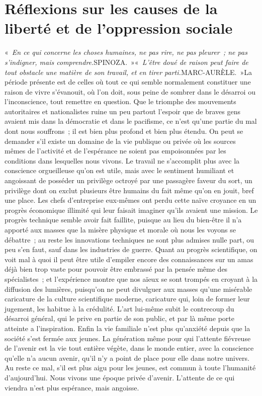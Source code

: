 \documentclass[french,twoside]{book} %
\begin{document}
\section[{Réflexions sur les causes de la liberté et de l’oppression sociale}]{Réflexions sur les causes de la liberté et de l’oppression sociale}\renewcommand{\leftmark}{Réflexions sur les causes de la liberté et de l’oppression sociale}

« \emph{En ce qui concerne les choses humaines, ne pas rire, ne pas pleurer ; ne pas s'indigner, mais comprendre.}{\citbibl SPINOZA.} »« \emph{L'être doué de raison peut faire de tout obstacle une matière de son travail, et en tirer parti.}{\citbibl MARC-AURÈLE.} »\noindent La période présente est de celles où tout ce qui semble normalement constituer une raison de vivre s'évanouit, où l'on doit, sous peine de sombrer dans le désarroi ou l'inconscience, tout remettre en question. Que le triomphe des mouvements autoritaires et nationalistes ruine un peu partout l'espoir que de braves gens avaient mis dans la démocratie et dans le pacifisme, ce n'est qu'une partie du mal dont nous souffrons ; il est bien plus profond et bien plus étendu. On peut se demander s'il existe un domaine de la vie publique ou privée où les sources mêmes de l'activité et de l'espérance ne soient pas empoisonnées par les conditions dans lesquelles nous vivons. Le travail ne s'accomplit plus avec la conscience orgueilleuse qu'on est utile, mais avec le sentiment humiliant et angoissant de posséder un privilège octroyé par une passagère faveur du sort, un privilège dont on exclut plusieurs être humains du fait même qu'on en jouit, bref une place. Les chefs d'entreprise eux-mêmes ont perdu cette naïve croyance en un progrès économique illimité qui leur faisait imaginer qu'ils avaient une mission. Le progrès technique semble avoir fait faillite, puisque au lieu du bien-être il n'a apporté aux masses que la misère physique et morale où nous les voyons se débattre ; au reste les innovations techniques ne sont plus admises nulle part, ou peu s'en faut, sauf dans les industries de guerre. Quant au progrès scientifique, on voit mal à quoi il peut être utile d'empiler encore des connaissances sur un amas déjà bien trop vaste pour pouvoir être embrassé par la pensée même des spécialistes ; et l'expérience montre que nos aïeux se sont trompés en croyant à la diffusion des lumières, puisqu'on ne peut divulguer aux masses qu'une misérable caricature de la culture scientifique moderne, caricature qui, loin de former leur jugement, les habitue à la crédulité. L'art lui-même subit le contrecoup du désarroi général, qui le prive en partie de son public, et par là même porte atteinte a l'inspiration. Enfin la vie familiale n'est plus qu'anxiété depuis que la société s'est fermée aux jeunes. La génération même pour qui l'attente fiévreuse de l'avenir est la vie tout entière végète, dans le monde entier, avec la conscience qu'elle n'a aucun avenir, qu'il n'y a point de place pour elle dans notre univers. Au reste ce mal, s'il est plus aigu pour les jeunes, est commun à toute l'humanité d'aujourd'hui. Nous vivons une époque privée d'avenir. L'attente de ce qui viendra n'est plus espérance, mais angoisse.\par
\end{document}

